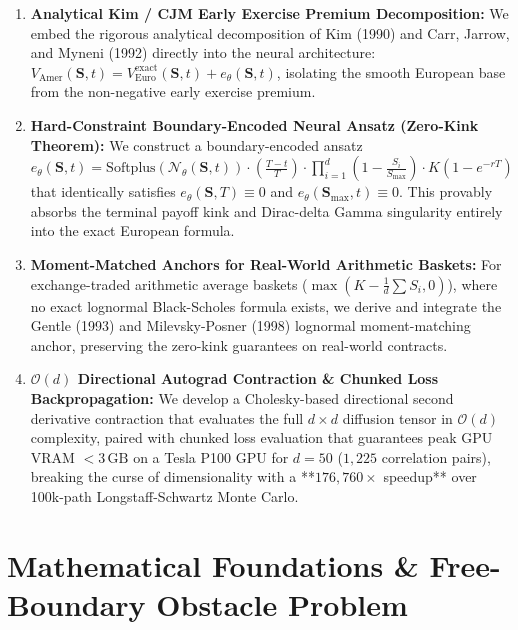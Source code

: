 \documentclass[11pt,a4paper]{article}
\begin{document}
\begin{enumerate}[label=\textbf{\arabic*.}]
    \item \textbf{Analytical Kim / CJM Early Exercise Premium Decomposition:} We embed the rigorous analytical decomposition of Kim (1990) \cite{kim1990analytic} and Carr, Jarrow, and Myneni (1992) \cite{carr1992alternative} directly into the neural architecture: $V_{\text{Amer}}(\mathbf{S}, t) = V_{\text{Euro}}^{\text{exact}}(\mathbf{S}, t) + e_\theta(\mathbf{S}, t)$, isolating the smooth European base from the non-negative early exercise premium.
    \item \textbf{Hard-Constraint Boundary-Encoded Neural Ansatz (Zero-Kink Theorem):} We construct a boundary-encoded ansatz $e_\theta(\mathbf{S}, t) = \text{Softplus}(\mathcal{N}_\theta(\mathbf{S}, t)) \cdot \left(\frac{T-t}{T}\right) \cdot \prod_{i=1}^d \left(1 - \frac{S_i}{S_{\max}}\right) \cdot K\left(1 - e^{-rT}\right)$ that identically satisfies $e_\theta(\mathbf{S}, T) \equiv 0$ and $e_\theta(\mathbf{S}_{\max}, t) \equiv 0$. This provably absorbs the terminal payoff kink and Dirac-delta Gamma singularity entirely into the exact European formula.
    \item \textbf{Moment-Matched Anchors for Real-World Arithmetic Baskets:} For exchange-traded arithmetic average baskets ($\max(K - \frac{1}{d}\sum S_i, 0)$), where no exact lognormal Black-Scholes formula exists, we derive and integrate the Gentle (1993) \cite{gentle1993basket} and Milevsky-Posner (1998) \cite{milevsky1998valuing} lognormal moment-matching anchor, preserving the zero-kink guarantees on real-world contracts.
    \item \textbf{$\mathcal{O}(d)$ Directional Autograd Contraction \& Chunked Loss Backpropagation:} We develop a Cholesky-based directional second derivative contraction that evaluates the full $d \times d$ diffusion tensor in $\mathcal{O}(d)$ complexity, paired with chunked loss evaluation that guarantees peak GPU VRAM $< 3\,\text{GB}$ on a Tesla P100 GPU for $d=50$ ($1,225$ correlation pairs), breaking the curse of dimensionality with a **$176,760\times$ speedup** over 100k-path Longstaff-Schwartz Monte Carlo.
\end{enumerate}

\section{Mathematical Foundations \& Free-Boundary Obstacle Problem}
\end{document}
